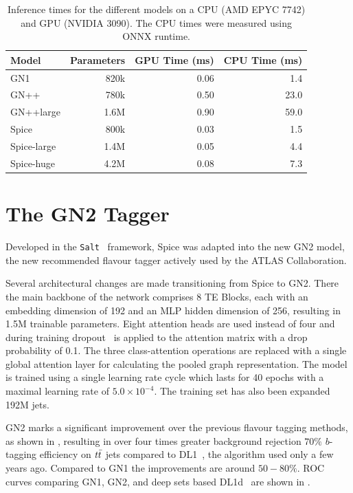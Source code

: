\begin{table}[h!]
    \centering
    \begin{tabular}{lrrr}
        \toprule
        Model           & Parameters & GPU Time (ms) & CPU Time (ms) \\
        \midrule
        \Gls{GN1}       & 820k       & 0.06          & 1.4           \\
        \Gls{GN++}      & 780k       & 0.50          & 23.0          \\
        \Gls{GN++}large & 1.6M       & 0.90          & 59.0          \\
        Spice           & 800k       & 0.03          & 1.5           \\
        Spice-large     & 1.4M       & 0.05          & 4.4           \\
        Spice-huge      & 4.2M       & 0.08          & 7.3           \\
        \bottomrule
    \end{tabular}
    \caption{Inference times for the different models on a CPU (AMD EPYC 7742) and GPU (NVIDIA 3090). The CPU times were measured using ONNX runtime.}
    \label{tab:inference}
\end{table}

\FloatBarrier

\section{The GN2 Tagger}

Developed in the \texttt{Salt}~\cite{Salt} framework, Spice was adapted into the new GN2 model, the new recommended flavour tagger actively used by the \Gls{ATLAS} Collaboration.

Several architectural changes are made transitioning from Spice to GN2.
There the main backbone of the network comprises 8 TE Blocks, each with an embedding dimension of 192 and an MLP hidden dimension of 256, resulting in 1.5M trainable parameters.
Eight attention heads are used instead of four and during training dropout~\cite{Dropout} is applied to the attention matrix with a drop probability of 0.1.
The three class-attention operations are replaced with a single global attention layer for calculating the pooled graph representation.
The model is trained using a single learning rate cycle which lasts for 40 epochs with a maximal learning rate of $5.0 \times 10^{-4}$.
The training set has also been expanded 192M jets.

GN2 marks a significant improvement over the previous flavour tagging methods, as shown in , resulting in over four times greater background rejection $70\%$ $b$-tagging efficiency on $t\bar{t}$ jets compared to DL1~\cite{DL1}, the algorithm used only a few years ago.
Compared to \Gls{GN1} the improvements are around $50-80\%$.
ROC curves comparing \Gls{GN1}, GN2, and deep sets based DL1d~\cite{DL1D}  are shown in .

